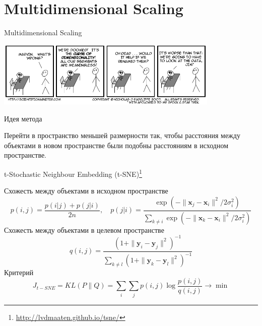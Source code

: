 \documentclass[aspectratio=169]{beamer}
\begin{document}

\section{Multidimensional Scaling}


\begin{frame}

\begin{center}
{\Large Multidimensional Scaling}

\vspace{1em}
\includegraphics[width=0.8\textwidth]{images/curse.png}
\end{center}

\end{frame}

\begin{frame}{Идея метода}

Перейти в пространство меньшей размерности так, чтобы расстояния между объектами в новом пространстве были подобны расстояниям в исходном пространстве.

\end{frame}

\begin{frame}{t-Stochastic Neighbour Embedding (t-SNE)\footnote{\url{http://lvdmaaten.github.io/tsne/}}}

Схожесть между объектами в исходном пространстве
\[
p(i, j) = \frac{p(i | j) + p(j | i)}{2n}, \quad p(j | i) = \frac{\exp(-\|\mathbf{x}_j-\mathbf{x}_i\|^2/{2 \sigma_i^2})}{\sum_{k \neq i}\exp(-\|\mathbf{x}_k-\mathbf{x}_i\|^2/{2 \sigma_i^2})}
\]
Схожесть между объектами в целевом пространстве
\[
q(i, j) = \frac{(1 + \| \mathbf{y}_i - \mathbf{y}_j \|^2)^{-1}}{\sum_{k \neq l}(1 + \| \mathbf{y}_k - \mathbf{y}_l \|^2)^{-1}}
\]
Критерий
\[
J_{t-SNE} = KL(P \| Q) = \sum_i \sum_j p(i, j) \log \frac{p(i, j)}{q(i, j)} \rightarrow \min
\]

\end{frame}
\end{document}
